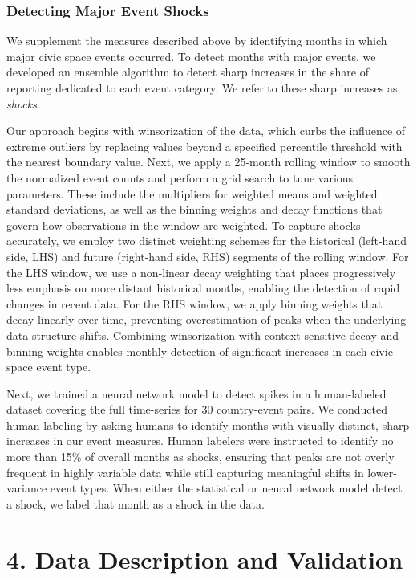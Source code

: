 \documentclass[
  letterpaper,
  DIV=11,
  numbers=noendperiod]{scrartcl}
\begin{document}
\hypertarget{detecting-major-event-shocks}{%
\subsubsection{Detecting Major Event
Shocks}\label{detecting-major-event-shocks}}

We supplement the measures described above by identifying months in
which major civic space events occurred. To detect months with major
events, we developed an ensemble algorithm to detect sharp increases in
the share of reporting dedicated to each event category. We refer to
these sharp increases as \emph{shocks}.

Our approach begins with winsorization of the data, which curbs the
influence of extreme outliers by replacing values beyond a specified
percentile threshold with the nearest boundary value. Next, we apply a
25-month rolling window to smooth the normalized event counts and
perform a grid search to tune various parameters. These include the
multipliers for weighted means and weighted standard deviations, as well
as the binning weights and decay functions that govern how observations
in the window are weighted. To capture shocks accurately, we employ two
distinct weighting schemes for the historical (left-hand side, LHS) and
future (right-hand side, RHS) segments of the rolling window. For the
LHS window, we use a non-linear decay weighting that places
progressively less emphasis on more distant historical months, enabling
the detection of rapid changes in recent data. For the RHS window, we
apply binning weights that decay linearly over time, preventing
overestimation of peaks when the underlying data structure shifts.
Combining winsorization with context-sensitive decay and binning weights
enables monthly detection of significant increases in each civic space
event type.

Next, we trained a neural network model to detect spikes in a
human-labeled dataset covering the full time-series for 30 country-event
pairs. We conducted human-labeling by asking humans to identify months
with visually distinct, sharp increases in our event measures. Human
labelers were instructed to identify no more than 15\% of overall months
as shocks, ensuring that peaks are not overly frequent in highly
variable data while still capturing meaningful shifts in lower-variance
event types. When either the statistical or neural network model detect
a shock, we label that month as a shock in the data.

\hypertarget{sec-validation}{%
\section{4. Data Description and Validation}\label{sec-validation}}
\end{document}
